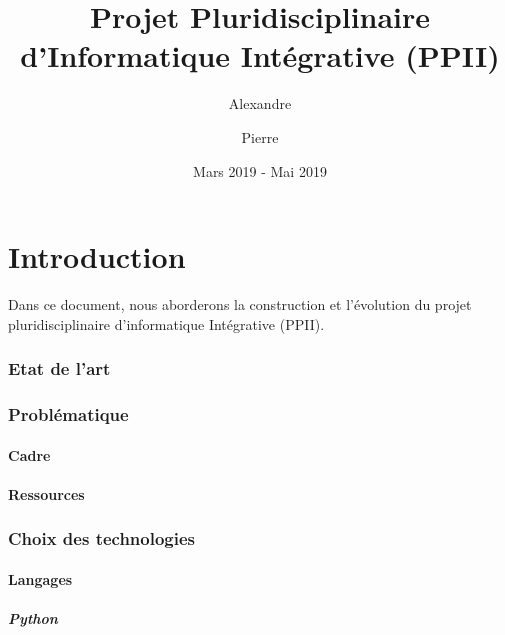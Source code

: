 \documentclass{article}
\title{Projet Pluridisciplinaire d'Informatique Intégrative (PPII)}
\author{
    Alexandre \sc{Cesari}
    \and
    Pierre \sc{Bouillon}
}
\date{Mars 2019 - Mai 2019}
\begin{document}
\maketitle

\newpage


\tableofcontents{}

\newpage


\part*{Introduction}

Dans ce document, nous aborderons la construction et l'évolution du projet pluridisciplinaire d'informatique Intégrative (PPII).

\newpage


\section{Etat de l'art}


\newpage


\section{Problématique}

\subsection{Cadre}

\subsection{Ressources}

\newpage


\section{Choix des technologies}

\subsection{Langages}

\subsubsection{Python}
\end{document}
